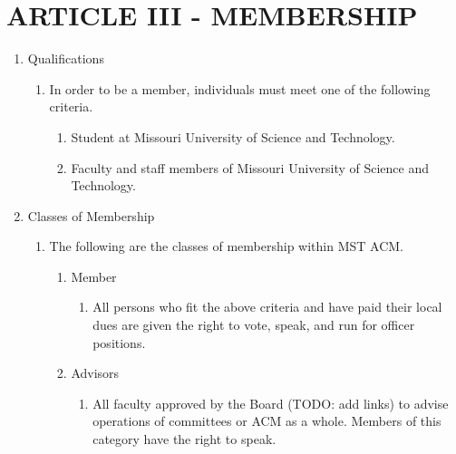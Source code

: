 
\section{ARTICLE III - MEMBERSHIP}
\begin{enumerate}[label=\arabic*.]
  \item Qualifications
    \begin{enumerate}[label=\alph*.]
      \item In order to be a member, individuals must meet one of the following
      criteria.
        \begin{enumerate}[label=\arabic*.]
          \item Student at Missouri University of Science and Technology.
          \item Faculty and staff members of Missouri University of Science and
          Technology.
        \end{enumerate}
    \end{enumerate}
  \item Classes of Membership
    \begin{enumerate}[label=\arabic*.]
      \item The following are the classes of membership within MST ACM.
        \begin{enumerate}[label=\alph*.]
          \item Member
            \begin{enumerate}[label=\arabic*.]
              \item All persons who fit the above criteria and have paid their
              local dues are given the right to vote, speak, and run for officer
              positions.
            \end{enumerate}
          \item Advisors
            \begin{enumerate}[label=\alph*.]
              \item All faculty approved by the Board (TODO: add links) to
              advise operations of committees or ACM as a whole. Members of this
              category have the right to speak.
            \end{enumerate}
        \end{enumerate}
    \end{enumerate}
\end{enumerate}


